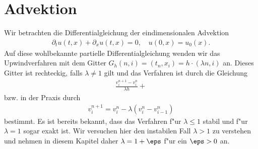 \section{Advektion}

Wir betrachten die Differentialgleichung der eindimensionalen Advektion
\begin{align}\label{eq:adv:pde}
\partial_t u(t, x) + \partial_x u(t, x) = 0, \quad u(0, x) = u_0(x).
\end{align}
Auf diese wohlbekannte partielle Differentialgleichung wenden wir das Upwindverfahren mit dem Gitter $G_h(n,i) = (t_n, x_i) = h \cdot (\lambda n, i)$ an.
Dieses Gitter ist rechteckig, falls $\lambda \neq 1$ gilt und das Verfahren ist durch die Gleichung
\begin{align}\label{eq:adv:scheme_rechnung}
\frac {v^{n+1}_i - v^n_i} {\lambda h} + 
\end{align}
bzw. in der Praxis durch
\begin{align}\label{eq:adv:scheme}
v^{n+1}_i = v^n_i - \lambda (v^n_i - v^n_{i-1})
\end{align}
bestimmt.
Es ist bereits bekannt, dass das Verfahren f"ur $\lambda \leq 1$ stabil und f"ur $\lambda = 1$ sogar exakt ist.
Wir versuchen hier den instabilen Fall $\lambda > 1$ zu verstehen und nehmen in diesem Kapitel daher $\lambda = 1 + \eps$ f"ur ein $\eps > 0$ an.